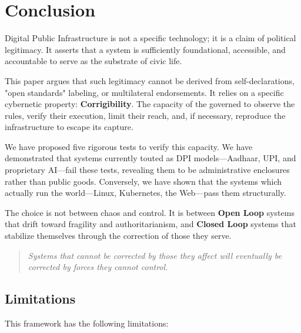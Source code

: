 \section{Conclusion}

Digital Public Infrastructure is not a specific technology; it is a claim of political legitimacy. It asserts that a system is sufficiently foundational, accessible, and accountable to serve as the substrate of civic life.

This paper argues that such legitimacy cannot be derived from self-declarations, "open standards" labeling, or multilateral endorsements. It relies on a specific cybernetic property: \textbf{Corrigibility}. The capacity of the governed to observe the rules, verify their execution, limit their reach, and, if necessary, reproduce the infrastructure to escape its capture.

We have proposed five rigorous tests to verify this capacity. We have demonstrated that systems currently touted as DPI models---Aadhaar, UPI, and proprietary AI---fail these tests, revealing them to be administrative enclosures rather than public goods. Conversely, we have shown that the systems which actually run the world---Linux, Kubernetes, the Web---pass them structurally.

The choice is not between chaos and control. It is between \textbf{Open Loop} systems that drift toward fragility and authoritarianism, and \textbf{Closed Loop} systems that stabilize themselves through the correction of those they serve.

\begin{quote}
\textit{Systems that cannot be corrected by those they affect will eventually be corrected by forces they cannot control.}
\end{quote}

\subsection{Limitations}

This framework has the following limitations:

